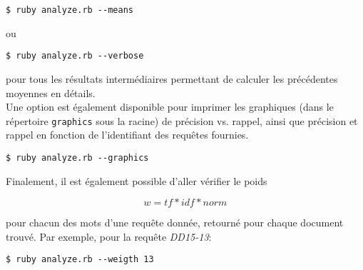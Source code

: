 \documentclass[12pt]{article}
\begin{document}
\begin{verbatim}
$ ruby analyze.rb --means
\end{verbatim}

ou

\begin{verbatim}
$ ruby analyze.rb --verbose
\end{verbatim}

pour tous les résultats intermédiaires permettant de calculer les précédentes moyennes en détails.\\

Une option est également disponible pour imprimer les graphiques (dans le répertoire \verb;graphics; sous la racine) de précision vs. rappel, ainsi que précision et rappel en fonction de l'identifiant des requêtes fournies.

\begin{verbatim}
$ ruby analyze.rb --graphics
\end{verbatim}

Finalement, il est également possible d'aller vérifier le poids

$$
w = tf * idf * norm
$$

pour chacun des mots d'une requête donnée, retourné pour chaque document trouvé. Par exemple, pour la requête \textit{DD15-13}:

\begin{verbatim}
$ ruby analyze.rb --weigth 13
\end{verbatim}

\end{document}
